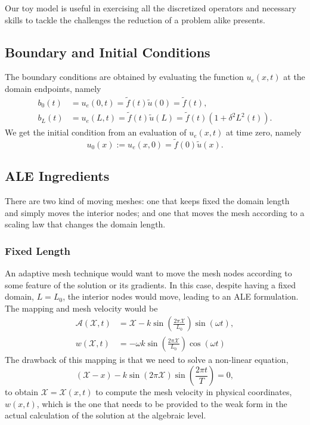 \documentclass[../main.tex]{subfiles}
\newcommand{\alemap}{\ensuremath{\mathcal{A}}}
\newcommand{\aleX}{\ensuremath{\mathcal{X}}}
\begin{document}
Our toy model is useful in exercising all the discretized operators and necessary skills to tackle the challenges the reduction of a problem alike presents. 

\subsection{Boundary and Initial Conditions}
The boundary conditions are obtained by evaluating the function $u_e(x,t)$ at the domain endpoints, namely 
\begin{subequations}
    \label{eq:1d_fom_mfp_boundary_conditions}
    \begin{align}
        b_0(t) &= u_e(0,t) = \tilde{f}(t) \tilde{u}(0) = \tilde{f}(t), \\
        b_L(t) &= u_e(L,t) = \tilde{f}(t) \tilde{u}(L) = \tilde{f}(t)\left(1 + \delta^2L^2(t)\right).
    \end{align}
\end{subequations}
We get the initial condition from an evaluation of $u_e(x,t)$ at time zero, namely
\begin{equation}
    u_0(x) := u_e(x,0) = \tilde{f}(0) \tilde{u}(x).
\end{equation}

\subsection{ALE Ingredients}
There are two kind of moving meshes: one that keeps fixed the domain length and simply moves the interior nodes; and one that moves the mesh according to a scaling law that changes the domain length.

\subsubsection{Fixed Length}
An adaptive mesh technique would want to move the mesh nodes according to some feature of the solution or its gradients. 
In this case, despite having a fixed domain, $L=L_0$, the interior nodes would move, leading to an ALE formulation.
The mapping and mesh velocity would be 
\begin{subequations}
    \begin{align}
        \alemap(\aleX, t) &= \aleX - k \sin(\frac{2\pi \aleX}{L_0}) \sin(\omega t), \\
        w(\aleX, t) &= - \omega k \sin(\frac{2\pi \aleX}{L_0}) \cos (\omega t)
    \end{align}
\end{subequations}
The drawback of this mapping is that we need to solve a non-linear equation,
\begin{equation}
    \left(\aleX -x \right) - k \sin(2\pi \aleX) \sin \left(\frac{2\pi t}{T}\right) = 0,
\end{equation}
to obtain $\aleX = \aleX(x,t)$ to compute the mesh velocity in physical coordinates, $w(x,t)$, which is the one that needs to be provided to the weak form in the actual calculation of the solution at the algebraic level.
\end{document}

